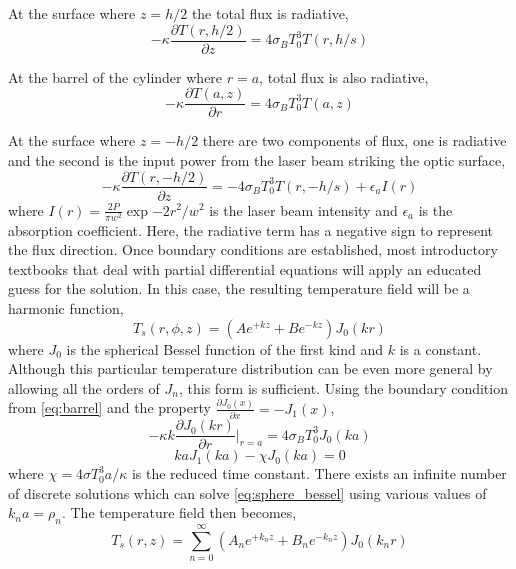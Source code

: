 	At the surface where $z=h/2$ the total flux is radiative,
	\begin{equation}\label{eq:faceh2}
	-\kappa \frac{\partial T(r,h/2)}{\partial z} = 4 \sigma_B T_0^3 T(r,h/s)
	\end{equation}
	
	At the barrel of the cylinder where $r=a$, total flux is also radiative,
	\begin{equation}\label{eq:barrel}
	-\kappa \frac{\partial T(a,z)}{\partial r} = 4 \sigma_B  T_0^3 T(a,z)
	\end{equation}
	
	At the surface where $z=-h/2$ there are two components of flux, one is radiative and the second is the input power from the laser beam striking the optic surface,
	\begin{equation}\label{eq:face-h2}
		-\kappa \frac{\partial T(r,-h/2)}{\partial z} =  -4 \sigma_B T_0^3 T(r,-h/s) + \epsilon_a I(r)
	\end{equation}
	where $I(r) = \frac{2P}{\pi w^2} \exp{-2r^2/w^2}$ is the laser beam intensity and $\epsilon_a$ is the absorption coefficient.  Here, the radiative term has a negative sign to represent the flux direction. Once boundary conditions are established,  most introductory textbooks that deal with partial differential equations will apply an educated guess for the solution.  In this case, the resulting temperature field will be a harmonic function,
	\begin{equation}
	T_s(r,\phi,z) =  (A e^{+k z} + B e^{-kz}) J_0(kr)
	\end{equation}
	where $J_0$ is the spherical Bessel function of the first kind and $k$ is a constant.  Although this particular temperature distribution can be even more general by allowing all the orders of $J_n$, this form is sufficient. Using the boundary condition from \ref{eq:barrel} and the property $\frac{\partial J_0(x)}{\partial x} = -J_1(x)$,
	\begin{equation}
		-\kappa k \frac{\partial J_0(kr)}{\partial r} \bigg\vert_{r=a} = 4 \sigma_B T_0^3 J_0(ka)
	\end{equation}
	\begin{equation}\label{eq:sphere_bessel}
		ka J_1(ka) - \chi J_0(ka)=0
	\end{equation}
	where $\chi = 4\sigma T_0^3 a/\kappa$ is the reduced time constant.  There exists an infinite number of discrete solutions which can solve \ref{eq:sphere_bessel} using various values of $k_n a = \rho_n$.
	The temperature field then becomes,
	\begin{equation}\label{eq:temp2}
	T_s(r,z) = \sum_{n=0}^{\infty} (A_n e^{+k_n z} + B_n e^{-k_n z}) J_0(k_n r)
	\end{equation}
